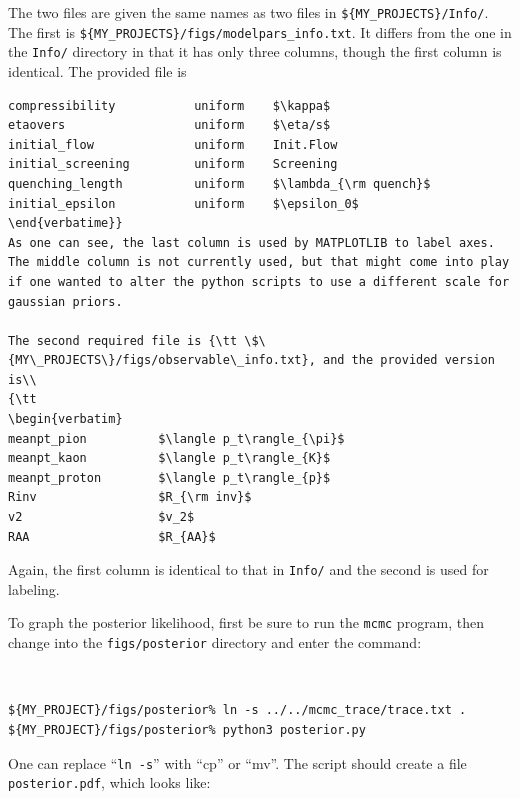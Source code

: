 \documentclass[UserManual.tex]{subfiles}
\begin{document}
The two files are given the same names as two files in {\tt \$\{MY\_PROJECTS\}/Info/}. The first is {\tt \$\{MY\_PROJECTS\}/figs/modelpars\_info.txt}. It differs from the one in the {\tt Info/} directory in that it has only three columns, though the first column is identical. The provided file is\\
{\tt\begin{verbatim}
compressibility           uniform    $\kappa$
etaovers                  uniform    $\eta/s$
initial_flow              uniform    Init.Flow
initial_screening         uniform    Screening
quenching_length          uniform    $\lambda_{\rm quench}$
initial_epsilon           uniform    $\epsilon_0$
\end{verbatime}}
As one can see, the last column is used by MATPLOTLIB to label axes. The middle column is not currently used, but that might come into play if one wanted to alter the python scripts to use a different scale for gaussian priors.

The second required file is {\tt \$\{MY\_PROJECTS\}/figs/observable\_info.txt}, and the provided version is\\
{\tt
\begin{verbatim}
meanpt_pion          $\langle p_t\rangle_{\pi}$
meanpt_kaon          $\langle p_t\rangle_{K}$
meanpt_proton        $\langle p_t\rangle_{p}$
Rinv                 $R_{\rm inv}$
v2                   $v_2$
RAA                  $R_{AA}$
\end{verbatim}}
Again, the first column is identical to that in {\tt Info/} and the second is used for labeling.

To graph the posterior likelihood, first be sure to run the {\tt mcmc} program, then change into the {\tt figs/posterior} directory and enter the command:
{\tt
\begin{verbatim}
${MY_PROJECT}/figs/posterior% ln -s ../../mcmc_trace/trace.txt .
${MY_PROJECT}/figs/posterior% python3 posterior.py
\end{verbatim}}
One can replace ``{\tt ln -s}'' with ``cp'' or ``mv''. The script should create a file {\tt posterior.pdf}, which looks like:
\end{document}
